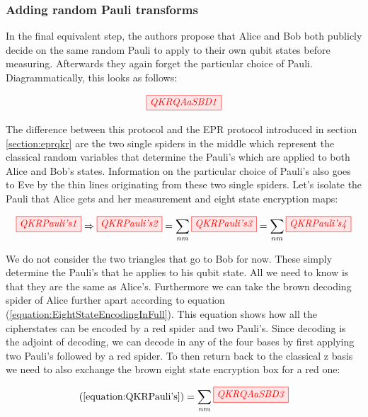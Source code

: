 \documentclass[]{article}
\begin{document}
\subsubsection{Adding random Pauli transforms}

In the final equivalent step, the authors propose that Alice and Bob both publicly decide on the same random Pauli to apply to their own qubit states before measuring. Afterwards they again forget the particular choice of Pauli. Diagrammatically, this looks as follows: 

\begin{equation}
\label{equation:QKRQAaSBD1}
\tikzfig{QKRQAaSBD1}
\end{equation}

The difference between this protocol and the EPR protocol introduced in section \ref{section:eprqkr} are the two single spiders in the middle which represent the classical random variables that determine the Pauli's which are applied to both Alice and Bob's states. Information on the particular choice of Pauli's also goes to Eve by the thin lines originating from these two single spiders. Let's isolate the Pauli that Alice gets and her measurement and eight state encryption maps:

\begin{equation}
	\label{equation:QKRPauli's}
	\tikzfig{QKRPauli's1} \Rightarrow \tikzfig{QKRPauli's2} = \sum\limits_{nm} \tikzfig{QKRPauli's3}  = \sum\limits_{nm} \tikzfig{QKRPauli's4}
\end{equation}

We do not consider the two triangles that go to Bob for now. These simply determine the Pauli's that he applies to his qubit state. All we need to know is that they are the same as Alice's. Furthermore we can take the brown decoding spider of Alice further apart according to equation (\ref{equation:EightStateEncodingInFull}). This equation shows how all the cipherstates can be encoded by a red spider and two Pauli's. Since decoding is the adjoint of decoding, we can decode in any of the four bases by first applying two Pauli's followed by a red spider. To then return back to the classical z basis we need to also exchange the brown eight state encryption box for a red one:

\begin{equation}
	\label{equation:QKRQAaSBD3}
	(\ref{equation:QKRPauli's}) = \sum\limits_{nm}\tikzfig{QKRQAaSBD3}
\end{equation}
\end{document}
